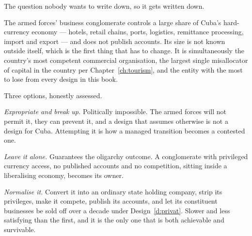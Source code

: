 The question nobody wants to write down, so it gets written down.

The armed forces' business conglomerate controls a large share of Cuba's
hard-currency economy --- hotels, retail chains, ports, logistics, remittance
processing, import and export --- and does not publish accounts. Its size is not
known outside itself, which is the first thing that has to change. It is
simultaneously the country's most competent commercial organisation, the largest
single misallocator of capital in the country per Chapter~\ref{ch:tourism}, and
the entity with the most to lose from every design in this book.

Three options, honestly assessed.

\emph{Expropriate and break up.} Politically impossible. The armed forces will
not permit it, they can prevent it, and a design that assumes otherwise is not a
design for Cuba. Attempting it is how a managed transition becomes a contested
one.

\emph{Leave it alone.} Guarantees the oligarchy outcome. A conglomerate with
privileged currency access, no published accounts and no competition, sitting
inside a liberalising economy, becomes its owner.

\emph{Normalise it.} Convert it into an ordinary state holding company, strip its
privileges, make it compete, publish its accounts, and let its constituent
businesses be sold off over a decade under Design~\ref{d:privat}. Slower and less
satisfying than the first, and it is the only one that is both achievable and
survivable.

